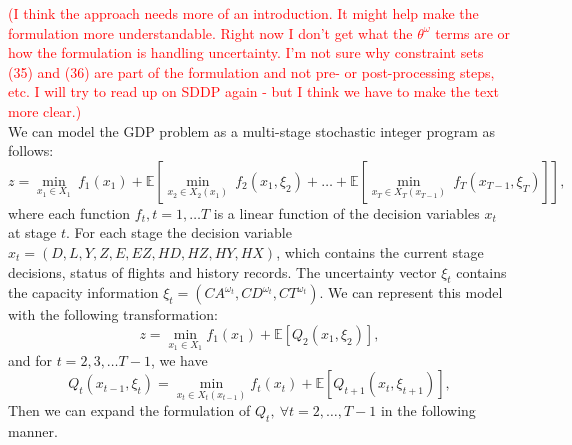 \documentclass[12pt]{article}
\begin{document}
	\newline
	\textcolor{red}{(I think the approach needs more of an introduction.  It might help make the formulation more understandable.  Right now I don't get what the $\theta^\omega$ terms are or how the formulation is handling uncertainty.  I'm not sure why constraint sets (35) and (36) are part of the formulation and not pre- or post-processing steps, etc.  I will try to read up on SDDP again - but I think we have to make the text more clear.)}\\
	\newline
	We can model the GDP problem as a multi-stage stochastic integer program as follows: 
	\begin{equation}
		z = \min_{x_1 \in X_1} \  f_1(x_1) + \mathbb{E} \left[ \min_{x_2 \in X_2(x_1)} \ f_2(x_1, \xi_2) + \dots + \mathbb{E} \left[ \min_{x_T \in X_T(x_{T-1})} \ f_T(x_{T-1}, \xi_T)\right] \right],
	\end{equation}
	where each function \(f_t, t = 1, \dots T\) is a linear function of the decision variables \(x_t\) at stage \(t\). For each stage the decision variable \(x_t = (D,L,Y,Z,E,EZ,HD,HZ,HY,HX)\), which contains the current stage decisions, status of flights and history records. The uncertainty vector \(\xi_t\) contains the capacity information \(\xi_t = (CA^{\omega_t}, CD^{\omega_t}, CT^{\omega_t})\). We can represent this model with the following transformation:
	\begin{equation}
		z = \min_{x_1 \in X_1} f_1(x_1) + \mathbb{E}\left[ Q_2(x_1, \xi_2)\right],
	\end{equation}
	and for \(t = 2, 3, \dots T - 1\), we have 
	\begin{equation}
		Q_t(x_{t-1},\xi_t) = \min_{x_t \in X_{t}(x_{t-1})}f_t(x_t) + \mathbb{E} \left[ Q_{t+1}(x_t, \xi_{t+1})\right],
	\end{equation}
	Then we can expand the formulation of \(Q_t,\ \forall t = 2, \dots, T-1\) in the following manner.
\end{document}
